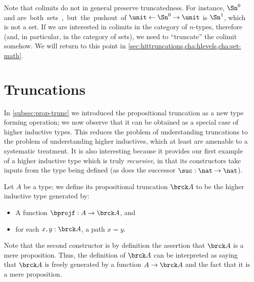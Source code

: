 \begin{rmk}
  Note that colimits do not in general preserve truncatedness.
  For instance, $\Sn^0$ and \unit are both sets, but the pushout of $\unit \leftarrow \Sn^0 \to \unit$ is $\Sn^1$, which is not a set.
  If we are interested in colimits in the category of $n$-types, therefore (and, in particular, in the category of sets), we need to ``truncate'' the colimit somehow.
  We will return to this point in \cref{sec:hittruncations,cha:hlevels,cha:set-math}.
\end{rmk}


\section{Truncations}
\label{sec:hittruncations}

%
In \cref{subsec:prop-trunc} we introduced the propositional truncation as a new type forming operation;
we now observe that it can be obtained as a special case of higher inductive types.
This reduces the problem of understanding truncations to the problem of understanding higher inductives, which at least are amenable to a systematic treatment.
It is also interesting because it provides our first example of a higher inductive type which is truly \emph{recursive}, in that its constructors take inputs from the type being defined (as does the successor $\suc:\nat\to\nat$).

Let $A$ be a type; we define its propositional truncation $\brck A$ to be the higher inductive type generated by:
\begin{itemize}
\item A function $\bprojf : A \to \brck A$, and
\item for each $x,y:\brck A$, a path $x=y$.
\end{itemize}
Note that the second constructor is by definition the assertion that $\brck A$ is a mere proposition.
Thus, the definition of $\brck A$ can be interpreted as saying that $\brck A$ is freely generated by a function $A\to\brck A$ and the fact that it is a mere proposition.

